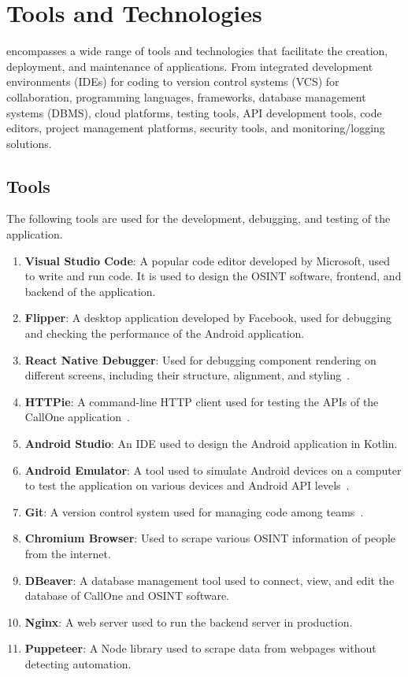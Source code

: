 \chapter{Tools and Technologies}\label{ch:tools-and-technologies}

\justify
{\myprojectname} encompasses a wide range of tools and technologies that facilitate the creation, deployment, and maintenance of applications.
From integrated development environments (IDEs) for coding to version control systems (VCS) for collaboration, programming languages, frameworks, database management systems (DBMS), cloud platforms, testing tools, API development tools, code editors, project management platforms, security tools, and monitoring/logging solutions.

\section{Tools}\label{sec:tools}
\justify

The following tools are used for the development, debugging, and testing of the application.

\begin{enumerate}[label=\roman*.]
  \item \textbf{Visual Studio Code}: A popular code editor developed by Microsoft, used to write and run code.\cite{VSCode}
  It is used to design the OSINT software, frontend, and backend of the application.
  \item \textbf{Flipper}: A desktop application developed by Facebook, used for debugging and checking the performance of the Android application. \cite{FLP}
  \item \textbf{React Native Debugger}: Used for debugging component rendering on different screens, including their structure, alignment, and styling~\cite{RDT}.
  \item \textbf{HTTPie}: A command-line HTTP client used for testing the APIs of the CallOne application~\cite{Httpie}.
  \item \textbf{Android Studio}: An IDE used to design the Android application in Kotlin.
  \item \textbf{Android Emulator}: A tool used to simulate Android devices on a computer to test the application on various devices and Android API levels~\cite{Android Studio}.
  \item \textbf{Git}: A version control system used for managing code among teams~\cite{Git}.
  \item \textbf{Chromium Browser}: Used to scrape various OSINT information of people from the internet.
  \item \textbf{DBeaver}: A database management tool used to connect, view, and edit the database of CallOne and OSINT software.
  \item \textbf{Nginx}: A web server used to run the backend server in production.
  \item \textbf{Puppeteer}: A Node library used to scrape data from webpages without detecting automation.
\end{enumerate}


